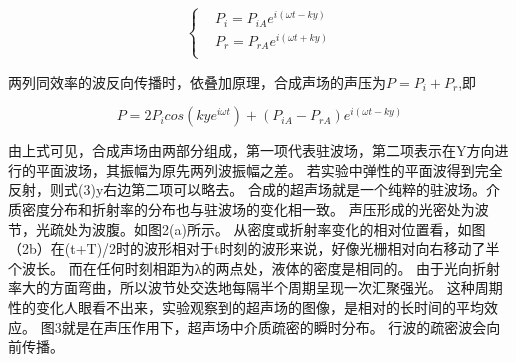 \documentclass[12pt,a4paper,UTF8]{ctexart}
\begin{document}
\begin{equation}
	\begin{cases}
		&P_i=P_{iA}e^{i(\omega t-ky)} \\
		&P_r=P_{rA}e^{i(\omega t+ky)}\\
	\end{cases}
\end{equation}

两列同效率的波反向传播时，依叠加原理，合成声场的声压为$P=P_i+P_r$,即

\begin{equation}
	P=2P_icos(kye^{i\omega t})+(P_{iA}-P_{rA})e^{i(\omega t-ky)}
\end{equation}

由上式可见，合成声场由两部分组成，第一项代表驻波场，第二项表示在Y方向进行的平面波场，其振幅为原先两列波振幅之差。
若实验中弹性的平面波得到完全反射，则式(3)y右边第二项可以略去。
合成的超声场就是一个纯粹的驻波场。介质密度分布和折射率的分布也与驻波场的变化相一致。
声压形成的光密处为波节，光疏处为波腹。如图2(a)所示。
从密度或折射率变化的相对位置看，如图（2b）在(t+T)/2时的波形相对于t时刻的波形来说，好像光栅相对向右移动了半个波长。
而在任何时刻相距为λ的两点处，液体的密度是相同的。
由于光向折射率大的方面弯曲，所以波节处交迭地每隔半个周期呈现一次汇聚强光。
这种周期性的变化人眼看不出来，实验观察到的超声场的图像，是相对的长时间的平均效应。
图3就是在声压作用下，超声场中介质疏密的瞬时分布。
行波的疏密波会向前传播。

\begin{figure}[htbp]
	\centering
	\caption{}
	\label{fig:tcvi}
\end{figure}
\end{document}

